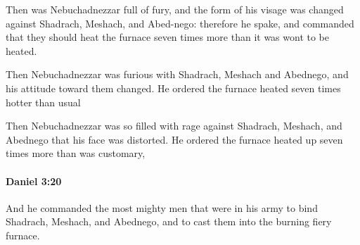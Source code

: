			\begin{versebox}
					\item[BHS] 
					\item[LXX] 
					\item[ASV] Then was Nebuchadnezzar full of fury, and the form of his visage was changed against Shadrach, Meshach, and Abed-nego: therefore he spake, and commanded that they should heat the furnace seven times more than it was wont to be heated.
					\item[NIV] Then Nebuchadnezzar was furious with Shadrach, Meshach and Abednego, and his attitude toward them changed. He ordered the furnace heated seven times hotter than usual
					\item[NRSV] Then Nebuchadnezzar was so filled with rage against Shadrach, Meshach, and Abednego that his face was distorted. He ordered the furnace heated up seven times more than was customary,
			\end{versebox}

		\paragraph{Daniel 3:20} %
			\label{DANIEL-3-20}

			And he commanded the most mighty men that were in his army to bind Shadrach, Meshach, and Abednego, and to cast them into the burning fiery furnace.

